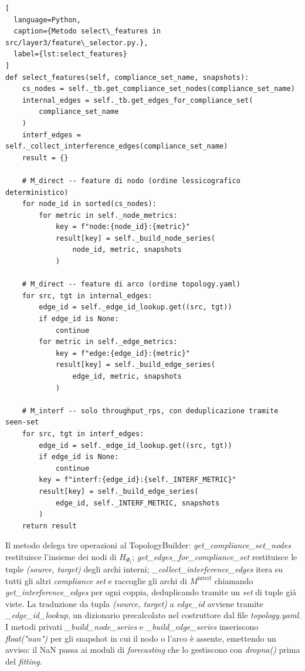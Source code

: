 \begin{lstlisting}[
  language=Python,
  caption={Metodo select\_features in src/layer3/feature\_selector.py.},
  label={lst:select_features}
]
def select_features(self, compliance_set_name, snapshots):
    cs_nodes = self._tb.get_compliance_set_nodes(compliance_set_name)
    internal_edges = self._tb.get_edges_for_compliance_set(
        compliance_set_name
    )
    interf_edges = self._collect_interference_edges(compliance_set_name)
    result = {}

    # M_direct -- feature di nodo (ordine lessicografico deterministico)
    for node_id in sorted(cs_nodes):
        for metric in self._node_metrics:
            key = f"node:{node_id}:{metric}"
            result[key] = self._build_node_series(
                node_id, metric, snapshots
            )

    # M_direct -- feature di arco (ordine topology.yaml)
    for src, tgt in internal_edges:
        edge_id = self._edge_id_lookup.get((src, tgt))
        if edge_id is None:
            continue
        for metric in self._edge_metrics:
            key = f"edge:{edge_id}:{metric}"
            result[key] = self._build_edge_series(
                edge_id, metric, snapshots
            )

    # M_interf -- solo throughput_rps, con deduplicazione tramite seen-set
    for src, tgt in interf_edges:
        edge_id = self._edge_id_lookup.get((src, tgt))
        if edge_id is None:
            continue
        key = f"interf:{edge_id}:{self._INTERF_METRIC}"
        result[key] = self._build_edge_series(
            edge_id, self._INTERF_METRIC, snapshots
        )
    return result
\end{lstlisting}

Il metodo delega tre operazioni al TopologyBuilder: \textit{get\_compliance\_set\_nodes}
restituisce l'insieme dei nodi di $H_{\Phi_i}$; \textit{get\_edges\_for\_compliance\_set}
restituisce le tuple \textit{(source, target)} degli archi interni;
\textit{\_collect\_interference\_edges} itera su tutti gli altri \textit{compliance set} e
raccoglie gli archi di $M^{\text{interf}}$ chiamando \textit{get\_interference\_edges} per ogni
coppia, deduplicando tramite un \textit{set} di tuple già viste. La traduzione da tupla
\textit{(source, target)} a \textit{edge\_id} avviene tramite \textit{\_edge\_id\_lookup}, un
dizionario precalcolato nel costruttore dal file \textit{topology.yaml}. I metodi privati
\textit{\_build\_node\_series} e \textit{\_build\_edge\_series} inseriscono
\textit{float("nan")} per gli snapshot in cui il nodo o l'arco è assente, emettendo un avviso:
il NaN passa ai moduli di \textit{forecasting} che lo gestiscono con \textit{dropna()} prima del
\textit{fitting}.

